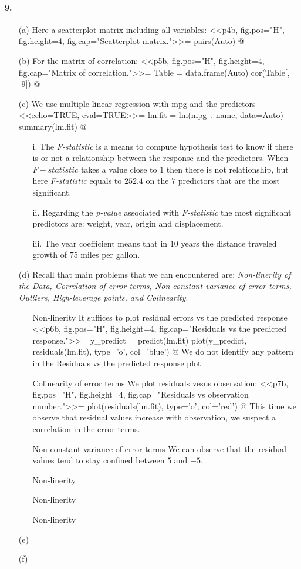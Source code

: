 \documentclass[a4paper, 10pt]{scrartcl}  %
\begin{document}
\paragraph{9.}
\begin{itemize}
	\item[(a)] Here a scatterplot matrix including all variables:
<<p4b, fig.pos="H", fig.height=4, fig.cap="Scatterplot matrix.">>=
pairs(Auto)
@
	\item[(b)] For the matrix of correlation:
<<p5b, fig.pos="H", fig.height=4, fig.cap="Matrix of correlation.">>=
Table = data.frame(Auto)
cor(Table[, -9])
@
	\item[(c)]We use multiple linear regression with mpg and the 
		predictors
<<echo=TRUE, eval=TRUE>>=
lm.fit = lm(mpg~.-name, data=Auto)
summary(lm.fit)
@
	\begin{itemize}
		\item[i.] The \emph{F-statistic} is a means to compute
			hypothesis test to know if there is or not a
			relationship between the response and the 
			predictors. When $F-statistic$ takes a value
			close to $1$ then there is not relationship,
			but here \emph{F-statistic} equals to $252.4$
			on the $7$ predictors that are the most 
			significant.
		\item[ii.] Regarding the \emph{p-value} associated
			with \emph{F-statistic} the most significant
			predictors are: weight, year, origin and
			displacement.
		\item[iii.] The year coefficient means that in $10$
			years the distance traveled growth of $75$
			miles per gallon.
	\end{itemize}
	\item[(d)] Recall that main problems that we can encountered
		are: \emph{Non-linerity of the Data, Correlation of
		error terms, Non-constant variance of error terms,
		Outliers, High-leverage points, and Colinearity}.
		\begin{itemize}
			\item[Non-linerity] It suffices to plot 
				residual errors vs the predicted 
				response
<<p6b, fig.pos="H", fig.height=4, fig.cap="Residuals vs the predicted response.">>=
y_predict = predict(lm.fit)
plot(y_predict, residuals(lm.fit), type='o', col='blue')
@
We do not identify any pattern in the Residuals vs the predicted
response plot
			\item[Colinearity of error terms] We plot 
				residuals vesus observation:
<<p7b, fig.pos="H", fig.height=4, fig.cap="Residuals vs observation number.">>=
plot(residuals(lm.fit), type='o', col='red')
@
				This time we observe that residual 
				values increase with observation,
				we suspect a correlation in the error
				terms.
			\item[Non-constant variance of error terms ] We
				can observe that the residual values
				tend to stay confined between $5$ and
				$-5$.
			\item[Non-linerity]
			\item[Non-linerity]
			\item[Non-linerity]
		\end{itemize}
	\item[(e)]
	\item[(f)]
\end{itemize}
\end{document}
